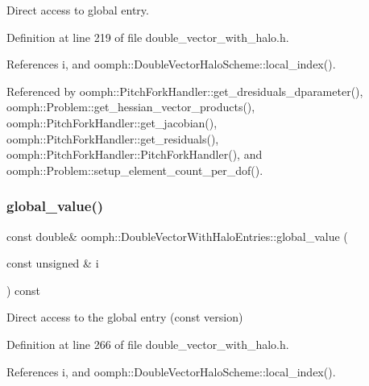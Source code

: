Direct access to global entry. 



Definition at line 219 of file double\+\_\+vector\+\_\+with\+\_\+halo.\+h.



References i, and oomph\+::\+Double\+Vector\+Halo\+Scheme\+::local\+\_\+index().



Referenced by oomph\+::\+Pitch\+Fork\+Handler\+::get\+\_\+dresiduals\+\_\+dparameter(), oomph\+::\+Problem\+::get\+\_\+hessian\+\_\+vector\+\_\+products(), oomph\+::\+Pitch\+Fork\+Handler\+::get\+\_\+jacobian(), oomph\+::\+Pitch\+Fork\+Handler\+::get\+\_\+residuals(), oomph\+::\+Pitch\+Fork\+Handler\+::\+Pitch\+Fork\+Handler(), and oomph\+::\+Problem\+::setup\+\_\+element\+\_\+count\+\_\+per\+\_\+dof().

\mbox{\label{classoomph_1_1DoubleVectorWithHaloEntries_a5a78785cedfe5bac2367f956b72f302b}} 
\subsubsection{\texorpdfstring{global\+\_\+value()}{global\_value()}\hspace{0.1cm}{\footnotesize\ttfamily [2/2]}}
{\footnotesize\ttfamily const double\& oomph\+::\+Double\+Vector\+With\+Halo\+Entries\+::global\+\_\+value (\begin{DoxyParamCaption}\item[{const unsigned \&}]{i }\end{DoxyParamCaption}) const\hspace{0.3cm}{\ttfamily [inline]}}



Direct access to the global entry (const version) 



Definition at line 266 of file double\+\_\+vector\+\_\+with\+\_\+halo.\+h.



References i, and oomph\+::\+Double\+Vector\+Halo\+Scheme\+::local\+\_\+index().

\mbox{\label{classoomph_1_1DoubleVectorWithHaloEntries_a233cb55111ceb501a7a76c434801be4c}} 
